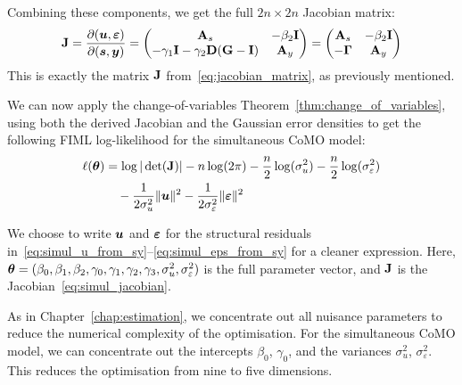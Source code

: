 Combining these components, we get the full $2n \times 2n$ Jacobian matrix:
\begin{equation}
\label{eq:simul_jacobian}
    \mathbf{J} = \frac{\partial(\bm{u}, \bm{\varepsilon})}{\partial(\bm{s}, \bm{y})}
    = \begin{pmatrix}
        \mathbf{A}_s & -\beta_2\mathbf{I} \\
        -\gamma_1\mathbf{I} - \gamma_2\mathbf{D}(\mathbf{G} - \mathbf{I}) & \mathbf{A}_y
    \end{pmatrix}
    = \begin{pmatrix}
        \mathbf{A}_s & -\beta_2\mathbf{I} \\
        -\mathbf{\Gamma} & \mathbf{A}_y
    \end{pmatrix}
\end{equation}
This is exactly the matrix $\mathbf{J}$ from~\eqref{eq:jacobian_matrix}, as previously mentioned.

We can now apply the change-of-variables Theorem~\ref{thm:change_of_variables}, using both the derived Jacobian and the Gaussian error densities to get the following FIML log-likelihood for the simultaneous CoMO model:
\begin{equation}
\label{eq:simul_loglik}
\begin{aligned}
    \ell(\bm{\theta}) &= \log|\det(\mathbf{J})| - n\log(2\pi)
    - \frac{n}{2}\log(\sigma_u^2) - \frac{n}{2}\log(\sigma_\varepsilon^2) \\
    &\quad - \frac{1}{2\sigma_u^2}\|\bm{u}\|^2
    - \frac{1}{2\sigma_\varepsilon^2}\|\bm{\varepsilon}\|^2
\end{aligned}
\end{equation}

We choose to write $\bm{u}$ and $\bm{\varepsilon}$ for the structural residuals in~\eqref{eq:simul_u_from_sy}--\eqref{eq:simul_eps_from_sy} for a cleaner expression. Here, $\bm{\theta} = (\beta_0, \beta_1, \beta_2, \gamma_0, \gamma_1, \gamma_2, \gamma_3, \sigma_u^2, \sigma_\varepsilon^2)$ is the full parameter vector, and $\mathbf{J}$ is the Jacobian~\eqref{eq:simul_jacobian}.

As in Chapter~\ref{chap:estimation}, we concentrate out all nuisance parameters to reduce the numerical complexity of the optimisation. For the simultaneous CoMO model, we can concentrate out the intercepts $\beta_0$, $\gamma_0$, and the variances $\sigma_u^2$, $\sigma_\varepsilon^2$. This reduces the optimisation from nine to five dimensions.


